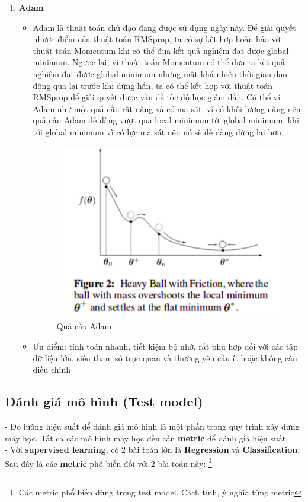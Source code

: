 \begin{enumerate}
    \item \textbf{Adam}
    \begin{itemize}
        \item Adam là thuật toán chủ đạo đang được sử dụng ngày này. Để giải quyết nhược điểm của thuật toán RMSprop, ta có sự kết hợp hoàn hảo với thuật toán Momentum khi có thể đưa kết quả nghiệm đạt được global minimum. Ngược lại, vì thuật toán Momentum có thể đưa ra kết quả nghiệm đạt được global minimum nhưng mất khá nhiều thời gian dao động qua lại trước khi dừng hẳn, ta có thể kết hợp với thuật toán RMSprop để giải quyết được vấn đề tốc độ học giảm dần. Có thể ví Adam như một quả cầu rất nặng và có ma sát, vì có khối lượng nặng nên quả cầu Adam dễ dàng vượt qua local minimum tới global minimum, khi tới global minimum vì có lực ma sát nên nó sẽ dễ dàng dừng lại hơn.  
        \begin{figure}[H]
            \centering
            \includegraphics[width=0.5\linewidth]{img/Adam.png}
            \caption{Quả cầu Adam}
            
        \end{figure}
        \item Ưu điểm: tính toán nhanh, tiết kiệm bộ nhớ, rất phù hợp đối với các tập dữ liệu lớn, siêu tham số trực quan và thường yêu cầu ít hoặc không cần điều chỉnh
    \end{itemize}
    
\end{enumerate}




\subsection{Đánh giá mô hình (Test model)}
- Đo lường hiệu suất để đánh giá mô hình là một phần trong quy trình xây dựng máy học. Tất cả các mô hình máy học đều cần \textbf{metric} để đánh giá hiệu suất.
\\- Với \textbf{supervised learning}, có 2 bài toán lớn là \textbf{Regression} và \textbf{Classification}. Sau đây là các \textbf{metric} phổ biến đối với 2 bài toán này: \footnote{Các metric phổ biến dùng trong test model. Cách tính, ý nghĩa từng metric}
